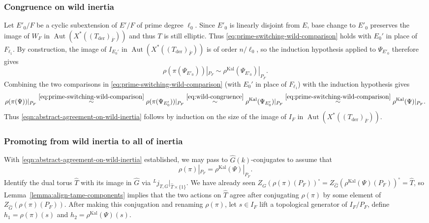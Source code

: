\documentclass[reqno]{amsart}
\numberwithin{equation}{subsection}
\newcommand{\ol}[1]{\overline{#1}}
\newcommand{\wh}[1]{\widehat{#1}}
\newcommand{\ld}{{}^L}
\DeclareMathOperator{\Aut}{Aut}
\DeclareMathOperator{\Kal}{Kal}
\DeclareMathOperator{\der}{der}
\theoremstyle{remark}
\numberwithin{equation}{subsection}
\numberwithin{figure}{subsection}
\begin{document}
\subsubsection{Congruence on wild inertia} Let $E'_0/F$ be a cyclic subextension of $E'/F$ of prime degree $\ell_0$.
Since $E'_0$ is linearly disjoint from $E$, base change to $E'_0$ preserves the image of $W_F$ in $\Aut(X^*((T_{\der})_{\ol F}))$ and thus $T$ is still elliptic. Thus \eqref{eq:prime-switching-wild-comparison} holds with $E_0'$ in place of $F_{\ell_1}$. By construction, the image of $I_{E_0'}$ in $\Aut(X^*((T_{\der})_{\ol F}))$ is of order $n/\ell_0$, so the induction hypothesis applied to $\Psi_{E'_0}$ therefore gives
\begin{equation}\label{eq:wild-congruence}
\rho(\pi(\Psi_{E'_0}))|_{P_F} \sim \rho^{\Kal}(\Psi_{E'_0})|_{P_F}.
\end{equation}
Combining the two comparisons in \eqref{eq:prime-switching-wild-comparison} (with $E_0'$ in place of $F_{\ell_1}$) with the induction hypothesis gives
\[
\begin{aligned}
\rho(\pi(\Psi))|_{P_F}
\stackrel{\eqref{eq:prime-switching-wild-comparison}}\sim \rho(\pi(\Psi_{E'_0}))|_{P_F}
    \stackrel{\eqref{eq:wild-congruence}}\sim \rho^{\Kal}(\Psi_{E'_0})|_{P_F}
\stackrel{\eqref{eq:prime-switching-wild-comparison}}\sim \rho^{\Kal}(\Psi)|_{P_F}.
\end{aligned}
\]
Thus \eqref{eqn:abstract-agreement-on-wild-inertia} follows by induction on the size of the image of $I_F$ in $\Aut(X^*((T_{\der})_{\ol F}))$.

\subsubsection{Promoting from wild inertia to all of inertia} With \eqref{eqn:abstract-agreement-on-wild-inertia} established, we may pass to $\wh G(k)$-conjugates to assume that 
\[
\rho(\pi)|_{P_F} = \rho^{\Kal}(\Psi)|_{P_F}.
\] 
Identify the dual torus $\wh T$ with its image in $\wh G$ via $\ld j_{T,G}|_{\wh T \times \{1\}}$. We have already seen $Z_{\wh G}(\rho(\pi)(P_F))^\circ = Z_{\wh G}(\rho^{\Kal}(\Psi)(P_F))^\circ = \wh T$, so Lemma~\ref{lemma:align-tame-components} implies that the two actions on $\wh T$ agree after conjugating $\rho(\pi)$ by some element of $Z_{\wh G}(\rho(\pi)(P_F))$. After making this conjugation and renaming $\rho(\pi)$, let $s\in I_F$ lift a topological generator of $I_F/P_F$, define $h_1=\rho(\pi)(s)$ and $h_2=\rho^{\Kal}(\Psi)(s)$. 
\end{document}
